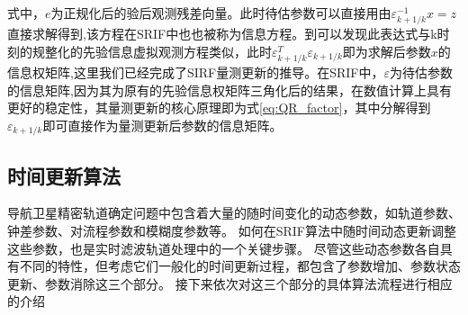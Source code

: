 式中，\(e\)为正规化后的验后观测残差向量。此时待估参数可以直接用由\(\varepsilon_{k+1/k}^{-1}x=z\)直接求解得到,该方程在SRIF中也也被称为信息方程。到可以发现此表达式与k时刻的规整化的先验信息虚拟观测方程类似，此时\(\varepsilon_{k+1/k}^{T}\varepsilon_{k+1/k}\)即为求解后参数\(x\)的信息权矩阵,这里我们已经完成了SIRF量测更新的推导。在SRIF中，\(\varepsilon\)为待估参数的信息矩阵,因为其为原有的先验信息权矩阵三角化后的结果，在数值计算上具有更好的稳定性，其量测更新的核心原理即为式\eqref{eq:QR_factor}，其中分解得到\(\varepsilon_{k+1/k}\)即可直接作为量测更新后参数的信息矩阵。

\subsection{时间更新算法}

导航卫星精密轨道确定问题中包含着大量的随时间变化的动态参数，如轨道参数、钟差参数、对流程参数和模糊度参数等。
如何在SRIF算法中随时间动态更新调整这些参数，也是实时滤波轨道处理中的一个关键步骤。
尽管这些动态参数各自具有不同的特性，但考虑它们一般化的时间更新过程，都包含了参数增加、参数状态更新、参数消除这三个部分。
接下来依次对这三个部分的具体算法流程进行相应的介绍

